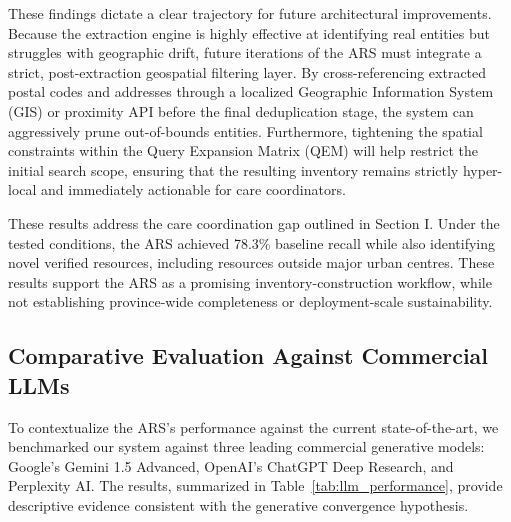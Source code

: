 \documentclass[12pt,oneside]{report}
\begin{document}
These findings dictate a clear trajectory for future architectural improvements. Because the extraction engine is highly effective at identifying real entities but struggles with geographic drift, future iterations of the ARS must integrate a strict, post-extraction geospatial filtering layer. By cross-referencing extracted postal codes and addresses through a localized Geographic Information System (GIS) or proximity API before the final deduplication stage, the system can aggressively prune out-of-bounds entities. Furthermore, tightening the spatial constraints within the Query Expansion Matrix (QEM) will help restrict the initial search scope, ensuring that the resulting inventory remains strictly hyper-local and immediately actionable for care coordinators.

These results address the care coordination gap outlined in Section I. Under the tested conditions, the ARS achieved 78.3\% baseline recall while also identifying novel verified resources, including resources outside major urban centres. These results support the ARS as a promising inventory-construction workflow, while not establishing province-wide completeness or deployment-scale sustainability.

\subsection{Comparative Evaluation Against Commercial LLMs}
To contextualize the ARS's performance against the current state-of-the-art, we benchmarked our system against three leading commercial generative models: Google's Gemini 1.5 Advanced, OpenAI's ChatGPT Deep Research, and Perplexity AI. The results, summarized in Table~\ref{tab:llm_performance}, provide descriptive evidence consistent with the generative convergence hypothesis.
\end{document}
